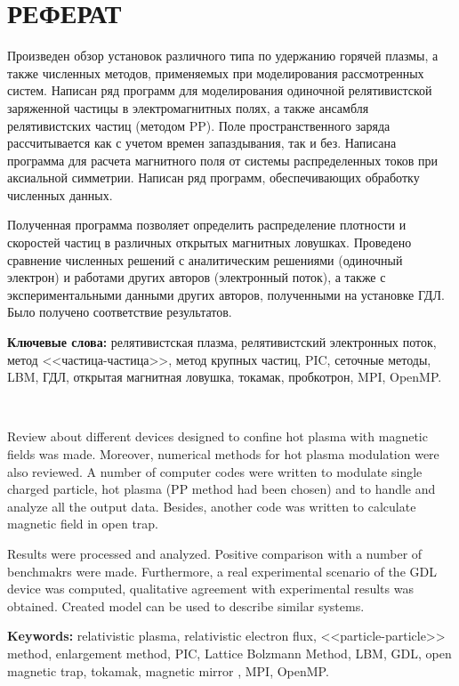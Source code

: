 \chapter*{РЕФЕРАТ}             

Произведен обзор установок различного типа по удержанию горячей плазмы, а также численных методов, применяемых при моделирования рассмотренных систем. Написан ряд программ для моделирования одиночной релятивистской заряженной частицы в электромагнитных полях, а также ансамбля релятивистских частиц (методом PP). Поле пространственного заряда рассчитывается как с учетом времен запаздывания, так и без. Написана программа для расчета магнитного поля от системы распределенных токов при аксиальной симметрии. Написан ряд программ, обеспечивающих обработку численных данных.

Полученная программа позволяет определить распределение плотности и скоростей частиц в различных открытых магнитных ловушках. Проведено сравнение численных решений с аналитическим решениями (одиночный электрон) и работами других авторов (электронный поток), а также с экспериментальными данными других авторов, полученными на установке ГДЛ. Было получено соответствие результатов.

\textbf{Ключевые слова:} релятивистская плазма, релятивистский электронных поток, метод <<частица-частица>>, метод крупных частиц, PIC, сеточные методы, LBM, ГДЛ, открытая магнитная ловушка, токамак, пробкотрон, MPI, OpenMP.

\ 

Review about different devices designed to confine hot plasma with magnetic fields was made. Moreover, numerical methods for hot plasma modulation were also reviewed. A number of computer codes were written to modulate single charged particle, hot plasma (PP method had been chosen) and to handle and analyze all the output data. Besides, another code was written to calculate magnetic field in open trap.

Results were processed and analyzed. Positive comparison with a number of benchmakrs were made. Furthermore, a real experimental scenario of the GDL device was computed, qualitative agreement with experimental results was obtained.
Created model can be used to describe similar systems.


\textbf{Keywords:} relativistic plasma, relativistic electron flux, <<particle-particle>> method, enlargement method, PIC, Lattice Bolzmann Method, LBM, GDL, open magnetic trap, tokamak, magnetic mirror , MPI, OpenMP.